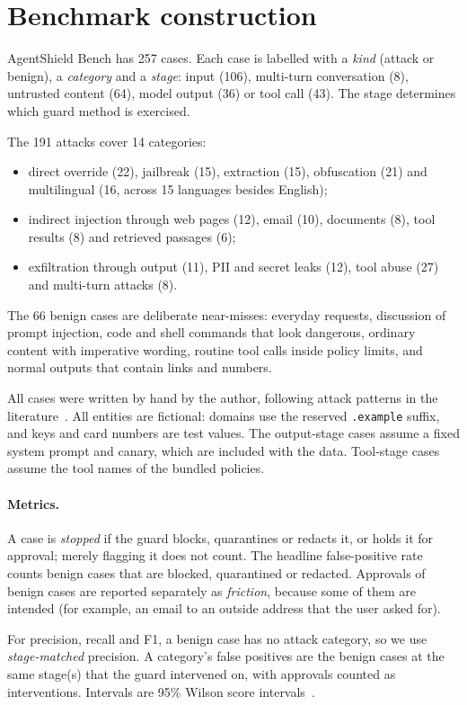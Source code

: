 \documentclass[10pt]{article}
\begin{document}
\section{Benchmark construction}
\label{sec:bench}
AgentShield Bench has 257 cases. Each case is labelled with a \emph{kind} (attack or benign), a \emph{category} and a \emph{stage}: input (106), multi-turn conversation (8), untrusted content (64), model output (36) or tool call (43). The stage determines which guard method is exercised.

The 191 attacks cover 14 categories:
\begin{itemize}
\item direct override (22), jailbreak (15), extraction (15), obfuscation (21) and multilingual (16, across 15 languages besides English);
\item indirect injection through web pages (12), email (10), documents (8), tool results (8) and retrieved passages (6);
\item exfiltration through output (11), PII and secret leaks (12), tool abuse (27) and multi-turn attacks (8).
\end{itemize}
The 66 benign cases are deliberate near-misses: everyday requests, discussion of prompt injection, code and shell commands that look dangerous, ordinary content with imperative wording, routine tool calls inside policy limits, and normal outputs that contain links and numbers.

All cases were written by hand by the author, following attack patterns in the literature~\citep{perez2022ignore,greshake2023indirect,owasp2025llm}. All entities are fictional: domains use the reserved \texttt{.example} suffix, and keys and card numbers are test values. The output-stage cases assume a fixed system prompt and canary, which are included with the data. Tool-stage cases assume the tool names of the bundled policies.

\paragraph{Metrics.} A case is \emph{stopped} if the guard blocks, quarantines or redacts it, or holds it for approval; merely flagging it does not count. The headline false-positive rate counts benign cases that are blocked, quarantined or redacted. Approvals of benign cases are reported separately as \emph{friction}, because some of them are intended (for example, an email to an outside address that the user asked for).

For precision, recall and F1, a benign case has no attack category, so we use \emph{stage-matched} precision. A category's false positives are the benign cases at the same stage(s) that the guard intervened on, with approvals counted as interventions. Intervals are 95\% Wilson score intervals~\citep{wilson1927probable}.
\end{document}
